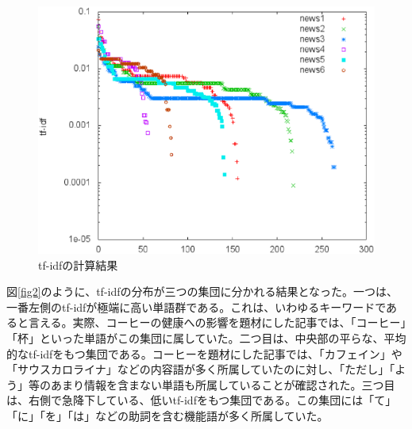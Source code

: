 \documentclass[12pt]{jarticle}
\begin{document}
\begin{figure}[htbp]
  \begin{center}
    \includegraphics[scale = 0.5]{image/content_word.eps}
  \end{center}
  \caption{tf-idfの計算結果}

\end{figure}

図\ref{fig2}のように、tf-idfの分布が三つの集団に分かれる結果となった。一つは、一番左側のtf-idfが極端に高い単語群である。これは、いわゆるキーワードであると言える。実際、コーヒーの健康への影響を題材にした記事では、「コーヒー」「杯」といった単語がこの集団に属していた。二つ目は、中央部の平らな、平均的なtf-idfをもつ集団である。コーヒーを題材にした記事では、「カフェイン」や「サウスカロライナ」などの内容語が多く所属していたのに対し、「ただし」「よう」等のあまり情報を含まない単語も所属していることが確認された。三つ目は、右側で急降下している、低いtf-idfをもつ集団である。この集団には「て」「に」「を」「は」などの助詞を含む機能語が多く所属していた。
\end{document}
